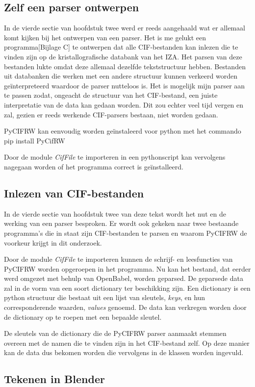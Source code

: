 \subsection{Zelf een parser ontwerpen}
In de vierde sectie van hoofdstuk twee werd er reeds aangehaald wat er allemaal komt kijken bij het ontwerpen van een parser. Het is me gelukt een programma[Bijlage C] te ontwerpen dat alle CIF-bestanden kan inlezen die te vinden zijn op de kristallografische databank van het IZA.\citep*{IZA1} Het parsen van deze bestanden lukte omdat deze allemaal dezelfde tekststructuur hebben. Bestanden uit databanken die werken met een andere structuur kunnen verkeerd worden geïnterpreteerd waardoor de parser nutteloos is. Het is mogelijk mijn parser aan te passen zodat, ongeacht de structuur van het CIF-bestand, een juiste interpretatie van de data kan gedaan worden. Dit zou echter veel tijd vergen en zal, gezien er reeds werkende CIF-parsers bestaan, niet worden gedaan.

PyCIFRW kan eenvoudig worden geïnstaleerd voor python met het commando
pip install PyCifRW 

Door de module \textit{CifFile} te importeren in een pythonscript kan vervolgens nagegaan worden of het programma correct is geïnstalleerd. 

\subsection{Inlezen van CIF-bestanden}
In de vierde sectie van hoofdstuk twee van deze tekst wordt het nut en de werking van een parser besproken. Er wordt ook gekeken naar twee bestaande programma's die in staat zijn CIF-bestanden te parsen en waarom PyCIFRW de voorkeur krijgt in dit onderzoek.
\par
Door de module \textit{CifFile} te importeren kunnen de schrijf- en leesfuncties van PyCIFRW worden opgeroepen in het programma. Nu kan het bestand, dat eerder werd omgezet met behulp van OpenBabel, worden geparsed. De geparsede data zal in de vorm van een soort dictionary ter beschikking zijn. Een dictionary is een python structuur die bestaat uit een lijst van sleutels, \textit{keys}, en hun corresponderende waarden, \textit{values} genoemd. De data kan verkregen worden door de dictionary op te roepen met een bepaalde sleutel.
\par
De sleutels van de dictionary die de PyCIFRW parser aanmaakt stemmen overeen met de namen die te vinden zijn in het CIF-bestand zelf. Op deze manier kan de data dus bekomen worden die vervolgens in de klassen worden ingevuld.

\subsection{Tekenen in Blender}


  






